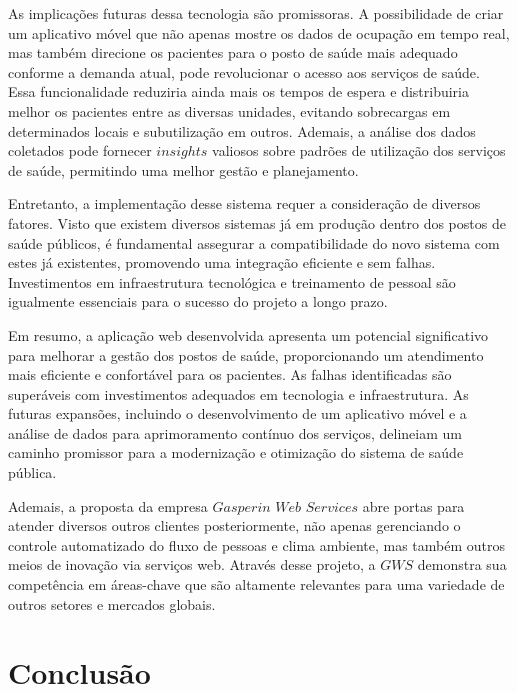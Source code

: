 \documentclass[conference, a4paper, 12pt]{IEEEtran}
\begin{document}
  As implicações futuras dessa tecnologia são promissoras. A possibilidade de criar um aplicativo móvel que não apenas mostre os dados de ocupação em tempo real, mas também direcione os pacientes para o posto de saúde mais adequado conforme a demanda atual, pode revolucionar o acesso aos serviços de saúde. Essa funcionalidade reduziria ainda mais os tempos de espera e distribuiria melhor os pacientes entre as diversas unidades, evitando sobrecargas em determinados locais e subutilização em outros. Ademais, a análise dos dados coletados pode fornecer $insights$ valiosos sobre padrões de utilização dos serviços de saúde, permitindo uma melhor gestão e planejamento. 

  Entretanto, a implementação desse sistema requer a consideração de diversos fatores. Visto que existem diversos sistemas já em produção dentro dos postos de saúde públicos, é fundamental assegurar a compatibilidade do novo sistema com estes já existentes, promovendo uma integração eficiente e sem falhas. Investimentos em infraestrutura tecnológica e treinamento de pessoal são igualmente essenciais para o sucesso do projeto a longo prazo.

  Em resumo, a aplicação web desenvolvida apresenta um potencial significativo para melhorar a gestão dos postos de saúde, proporcionando um atendimento mais eficiente e confortável para os pacientes. As falhas identificadas são superáveis com investimentos adequados em tecnologia e infraestrutura. As futuras expansões, incluindo o desenvolvimento de um aplicativo móvel e a análise de dados para aprimoramento contínuo dos serviços, delineiam um caminho promissor para a modernização e otimização do sistema de saúde pública.

  Ademais, a proposta da empresa $Gasperin$ $Web$ $Services$ abre portas para atender diversos outros clientes posteriormente, não apenas gerenciando o controle automatizado do fluxo de pessoas e clima ambiente, mas também outros meios de inovação via serviços web. Através desse projeto, a $GWS$ demonstra sua competência em áreas-chave que são altamente relevantes para uma variedade de outros setores e mercados globais.

\section{Conclusão}
\label{sec:conclusion}
\end{document}
